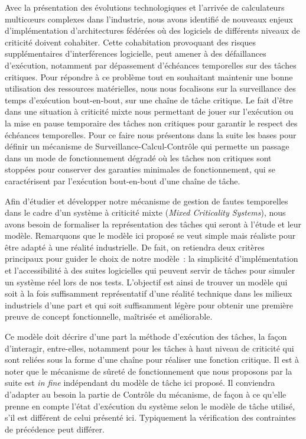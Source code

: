 \documentclass[french, a4paper, 11pt, twoside, pdftex]{StyleThese}
\begin{document}
    Avec la présentation des évolutions technologiques et l'arrivée de calculateurs multicœurs complexes dans l'industrie, nous avons identifié de nouveaux enjeux d'implémentation d'architectures fédérées où des logiciels de différents niveaux de criticité doivent cohabiter. Cette cohabitation provoquant des risques supplémentaires d'interférences logicielle, peut amener à des défaillances d'exécution, notamment par dépassement d'échéances temporelles sur des tâches critiques. Pour répondre à ce problème tout en souhaitant maintenir une bonne utilisation des ressources matérielles, nous nous focalisons sur la surveillance des temps d'exécution bout-en-bout, sur une chaîne de tâche critique. Le fait d'être dans une situation à criticité mixte nous permettant de jouer sur l'exécution ou la mise en pause temporaire des tâches non critiques pour garantir le respect des échéances temporelles. Pour ce faire nous présentons dans la suite les bases pour définir un mécanisme de Surveillance-Calcul-Contrôle qui permette un passage dans un mode de fonctionnement dégradé où les tâches non critiques sont stoppées pour conserver des garanties minimales de fonctionnement, qui se caractérisent par l'exécution bout-en-bout d'une chaîne de tâche.
    
    Afin d'étudier et développer notre mécanisme de gestion de fautes temporelles dans le cadre d'un système à criticité mixte (\textit{Mixed Criticality Systems}), nous avons besoin de formaliser la représentation des tâches qui seront à l'étude et leur modèle. Remarquons que le modèle ici proposé se veut simple mais réaliste pour être adapté à une réalité industrielle. De fait, on retiendra deux critères principaux pour guider le choix de notre modèle~: la simplicité d'implémentation et l'accessibilité à des suites logicielles qui peuvent servir de tâches pour simuler un système réel lors de nos tests. L'objectif est ainsi de trouver un modèle qui soit à la fois suffisamment représentatif d'une réalité technique dans les milieux industriels d'une part et qui soit suffisamment légère pour obtenir une première preuve de concept fonctionnelle, maîtrisée et améliorable.
    
    
    Ce modèle doit décrire d'une part la méthode d'exécution des tâches, la façon d'interagir, entre-elles, notamment pour les tâches à haut niveau de criticité qui sont reliées sous la forme d'une chaîne pour réaliser une fonction critique. Il est à noter que le mécanisme de sûreté de fonctionnement que nous proposons par la suite est \textit{in fine} indépendant du modèle de tâche ici proposé. Il conviendra d'adapter au besoin la partie de Contrôle du mécanisme, de façon à ce qu'elle prenne en compte l'état d'exécution du système selon le modèle de tâche utilisé, s'il est différent de celui présenté ici. Typiquement la vérification des contraintes de précédence peut différer.
    
\end{document}
